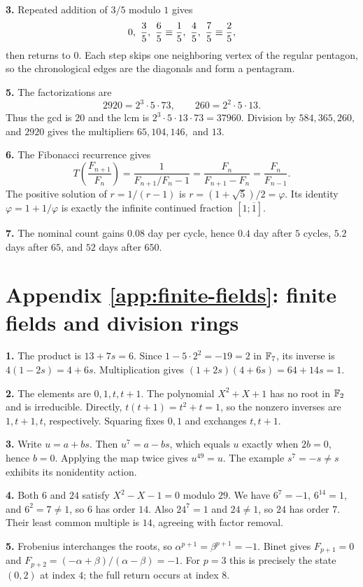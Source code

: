 \textbf{3.} Repeated addition of $3/5$ modulo $1$ gives
\[
  0,\ \frac35,\ \frac65\equiv\frac15,\
  \frac45,\ \frac75\equiv\frac25,
\]
then returns to $0$.  Each step skips one neighboring vertex of the regular
pentagon, so the chronological edges are the diagonals and form a pentagram.

\textbf{5.} The factorizations are
\[
  2920=2^3\cdot5\cdot73,
  \qquad 260=2^2\cdot5\cdot13.
\]
Thus the gcd is $20$ and the lcm is
$2^3\cdot5\cdot13\cdot73=37960$.  Division by $584,365,260,$ and $2920$
gives the multipliers $65,104,146,$ and $13$.

\textbf{6.} The Fibonacci recurrence gives
\[
 T\!\left(\frac{F_{n+1}}{F_n}\right)
 =\frac{1}{F_{n+1}/F_n-1}
 =\frac{F_n}{F_{n+1}-F_n}
 =\frac{F_n}{F_{n-1}}.
\]
The positive solution of $r=1/(r-1)$ is
$r=(1+\sqrt5)/2=\varphi$.  Its identity
$\varphi=1+1/\varphi$ is exactly the infinite continued fraction
$[1;\overline1]$.

\textbf{7.} The nominal count gains $0.08$ day per cycle, hence $0.4$ day
after $5$ cycles, $5.2$ days after $65$, and $52$ days after $650$.

\section*{Appendix \ref{app:finite-fields}: finite fields and division rings}

\textbf{1.} The product is $13+7s=6$. Since
$1-5\cdot2^2=-19=2$ in $\mathbb F_7$, its inverse is
$4(1-2s)=4+6s$. Multiplication gives
$(1+2s)(4+6s)=64+14s=1$.

\textbf{2.} The elements are $0,1,t,t+1$. The polynomial
$X^2+X+1$ has no root in $\mathbb F_2$ and is irreducible. Directly,
$t(t+1)=t^2+t=1$, so the nonzero inverses are $1,t+1,t$,
respectively. Squaring fixes $0,1$ and exchanges $t,t+1$.

\textbf{3.} Write $u=a+bs$. Then $u^7=a-bs$, which equals $u$
exactly when $2b=0$, hence $b=0$. Applying the map twice gives
$u^{49}=u$. The example $s^7=-s\ne s$ exhibits its nonidentity action.

\textbf{4.} Both $6$ and $24$ satisfy $X^2-X-1=0$ modulo $29$.
We have $6^7=-1$, $6^{14}=1$, and $6^2=7\ne1$, so $6$ has
order $14$. Also $24^7=1$ and $24\ne1$, so $24$ has order $7$.
Their least common multiple is $14$, agreeing with factor removal.

\textbf{5.} Frobenius interchanges the roots, so
$\alpha^{p+1}=\beta^{p+1}=-1$. Binet gives $F_{p+1}=0$ and
$F_{p+2}=(-\alpha+\beta)/(\alpha-\beta)=-1$.
For $p=3$ this is precisely the state $(0,2)$ at index $4$;
the full return occurs at index $8$.

